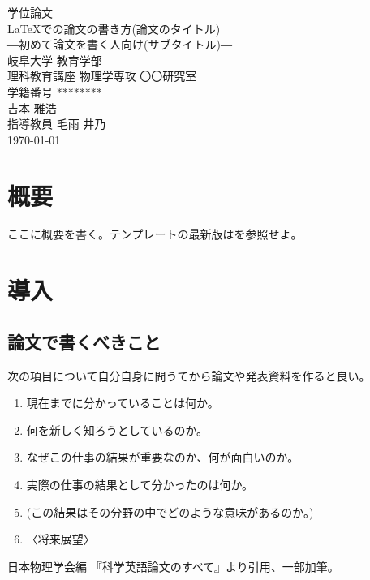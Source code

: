 \documentclass[a4j,openany,12pt]{jsbook}
\begin{document}
\begin{titlepage}
    \centering
    \vspace*{10truept}
    {\LARGE 学位論文}\\
    \vspace{100truept}
    {\LARGE \LaTeX での論文の書き方(論文のタイトル)}\\ %
    \vspace{10truept}
    {\Large ―初めて論文を書く人向け(サブタイトル)―}\\ %
    \vspace{140truept}
    {\Large 岐阜大学 教育学部}\\ %
    \vspace{10truept}
    {\Large 理科教育講座 物理学専攻 〇〇研究室}\\ %
    \vspace{20truept}
    {\Large 学籍番号 ********}\\ %
    \vspace{20truept}
    {\Large 吉本 雅浩}\\ %
    \vspace{50truept}
    {\Large 指導教員 毛雨 井乃}\\
    \vspace{50truept}
    {\Large \today} %
\end{titlepage}

\thispagestyle{empty} %
\tableofcontents %
\chapter*{概要}

ここに概要を書く。テンプレートの最新版は\cite{tex_sample}を参照せよ。

\chapter{導入}
\section{論文で書くべきこと}
次の項目について自分自身に問うてから論文や発表資料を作ると良い。
\begin{enumerate}
    \item 現在までに分かっていることは何か。
    \item 何を新しく知ろうとしているのか。
    \item なぜこの仕事の結果が重要なのか、何が面白いのか。
    \item 実際の仕事の結果として分かったのは何か。
    \item (この結果はその分野の中でどのような意味があるのか。)
    \item 〈将来展望〉
\end{enumerate}
日本物理学会編 『科学英語論文のすべて』より引用、一部加筆。
\end{document}
